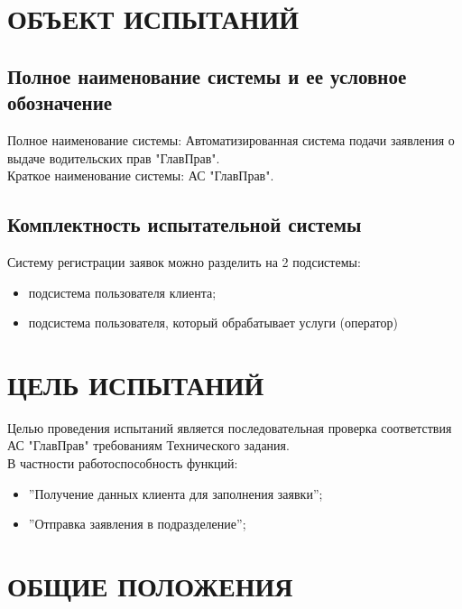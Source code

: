 \documentclass[russian, utf8, 12pt,pointsubsection,floatsubsection]{eskdtext}
\begin{document}
	
	
	
\section{ОБЪЕКТ ИСПЫТАНИЙ}

\subsection{Полное наименование системы и ее условное обозначение}
Полное наименование системы: Автоматизированная система подачи заявления о выдаче водительских прав "ГлавПрав".\\
Краткое наименование системы: АС "ГлавПрав".\\ 

\subsection{Комплектность испытательной системы}
Систему регистрации заявок можно разделить на 2 подсистемы:
\begin{itemize}
    \item подсистема пользователя клиента;
    \item подсистема пользователя, который обрабатывает услуги (оператор)
\end{itemize}

\section{ ЦЕЛЬ ИСПЫТАНИЙ}
Целью проведения испытаний является последовательная проверка соответствия АС "ГлавПрав" требованиям Технического задания.\\
В частности работоспособность функций:
\begin{itemize}
    \item ''Получение данных клиента для заполнения заявки'';
    \item ''Отправка заявления в подразделение'';
\end{itemize}

\section{ОБЩИЕ ПОЛОЖЕНИЯ}
\end{document}
